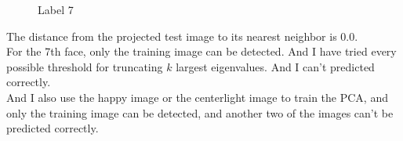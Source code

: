\documentclass[letterpaper]{polythesis}
\begin{document}
\begin{figure}[H]
  \centering
\caption{Label 7}
  \label{fig:result 7} %
\end{figure}

The distance from the projected test image to its nearest neighbor
is $0.0$.\\

For the 7th face, only the training image can be detected. And I have tried
every possible threshold for truncating $k$ largest eigenvalues. And I can't
predicted correctly. \\
And I also use the happy image or the centerlight image to train
the PCA, and only the training image can be detected, and another two of the images
can't be predicted correctly.
\end{document}
